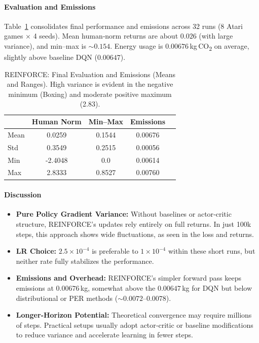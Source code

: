 \paragraph{Evaluation and Emissions}
Table~\ref{tab:reinforce_evalstats} consolidates final performance 
and emissions across 32 runs (8 Atari games $\times$ 4 seeds). 
Mean human‐norm returns are about $0.026$ (with large variance), 
and min–max is $\sim0.154$. 
Energy usage is $0.00676$\,kg\,CO\textsubscript{2} on average, 
slightly above baseline DQN ($0.00647$).

\begin{table}[htbp]
	\caption{REINFORCE: Final Evaluation and Emissions (Means and Ranges). 
		High variance is evident in the negative minimum (Boxing) and moderate positive maximum (2.83).}
	\label{tab:reinforce_evalstats}
	\centering
	\begin{tabular}{lcccc}
		\toprule
		& \textbf{Human Norm} & \textbf{Min--Max} & \textbf{Emissions} \\
		\midrule
		Mean & 0.0259 & 0.1544 & 0.00676 \\
		Std  & 0.3549 & 0.2515 & 0.00056 \\
		Min  & -2.4048 & 0.0    & 0.00614 \\
		Max  & 2.8333 & 0.8527 & 0.00760 \\
		\bottomrule
	\end{tabular}
\end{table}

\paragraph{Discussion}
\begin{itemize}
	\item \textbf{Pure Policy Gradient Variance:} 
	Without baselines or actor‐critic structure, REINFORCE’s updates rely entirely on full returns. 
	In just 100k steps, this approach shows wide fluctuations, as seen in the loss and returns.
	\item \textbf{LR Choice:} 
	$2.5\times10^{-4}$ is preferable to $1\times10^{-4}$ within these short runs, 
	but neither rate fully stabilizes the performance. 
	\item \textbf{Emissions and Overhead:} 
	REINFORCE’s simpler forward pass keeps emissions at $0.00676$\,kg, 
	somewhat above the $0.00647$\,kg for DQN but below distributional or PER methods ($\sim0.0072$--$0.0078$).
	\item \textbf{Longer‐Horizon Potential:} 
	Theoretical convergence may require millions of steps. 
	Practical setups usually adopt actor‐critic or baseline modifications to reduce variance 
	and accelerate learning in fewer steps.
\end{itemize}


